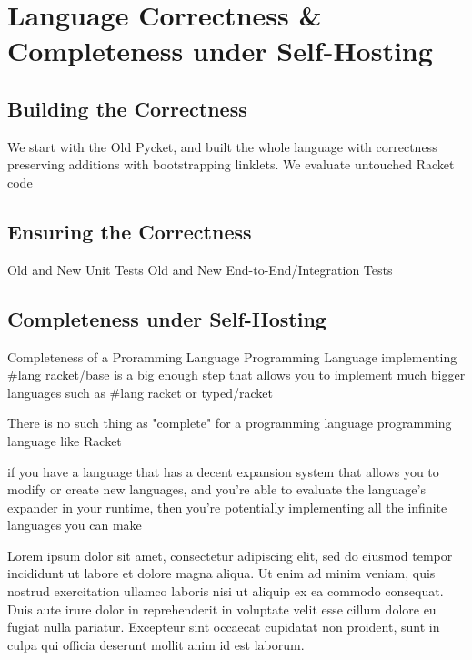\chapter{Language Correctness \& Completeness under Self-Hosting}

	\section{Building the Correctness}
		We start with the Old Pycket, and built the whole language with
		correctness preserving additions with bootstrapping linklets.
		We evaluate untouched Racket code

	\section{Ensuring the Correctness}
		Old and New Unit Tests
		Old and New End-to-End/Integration Tests


	\section{Completeness under Self-Hosting}

	Completeness of a Proramming Language Programming Language
	implementing \#lang racket/base is a big enough step that allows you to implement 
	much bigger languages such as \#lang racket or typed/racket

	There is no such thing as "complete" for a 
	programming language programming language like Racket

	if you have a language that has a decent expansion system that allows you to 
	modify or create new languages, and you're able to evaluate the language's 
	expander in your runtime, then you're potentially implementing all the 
	infinite languages you can make

Lorem ipsum dolor sit amet, consectetur adipiscing elit, sed do eiusmod tempor incididunt ut labore et dolore magna aliqua. Ut enim ad minim veniam, quis nostrud exercitation ullamco laboris nisi ut aliquip ex ea commodo consequat. Duis aute irure dolor in reprehenderit in voluptate velit esse cillum dolore eu fugiat nulla pariatur. Excepteur sint occaecat cupidatat non proident, sunt in culpa qui officia deserunt mollit anim id est laborum.
